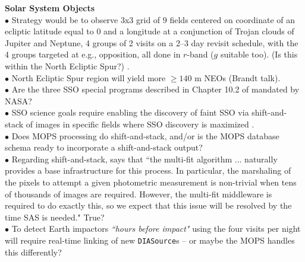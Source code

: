 \documentclass[DM,lsstdraft,toc]{lsstdoc}
\begin{document}
\medskip
\noindent \textbf{Solar System Objects}\\
$\bullet$ Strategy would be to observe 3x3 grid of 9 fields centered on coordinate of an ecliptic latitude equal to 0 and a longitude at a conjunction of Trojan clouds of Jupiter and Neptune, 4 groups of 2 visits on a 2--3 day revisit schedule, with the 4 groups targeted at e.g., opposition, all done in $r$-band ($g$ suitable too). (Is this within the North Ecliptic Spur?) \citep{BeckerWP}. \\
$\bullet$ North Ecliptic Spur region will yield more $\geq140$ m NEOs (Brandt talk).  \\
$\bullet$ Are the three SSO special programs described in Chapter 10.2 of \cite{OSWP} mandated by NASA? \\
$\bullet$ SSO science goals require enabling the discovery of faint SSO via shift-and-stack of images in specific fields where SSO discovery is maximized \citep{BeckerWP}. \\
$\bullet$ Does MOPS processing do shift-and-stack, and/or is the MOPS database schema ready to incorporate a shift-and-stack output? \\
$\bullet$ Regarding shift-and-stack, \cite{BeckerWP} says that ``the multi-fit algorithm ... naturally provides a base infrastructure for this process. In particular, the marshaling of the pixels to attempt a given photometric measurement is non-trivial when tens of thousands of images are required. However, the multi-fit middleware is required to do exactly this, so we expect that this issue will be resolved by the time SAS is needed." True? \\
$\bullet$ To detect Earth impactors {\it ``hours before impact"} using the four visits per night will require real-time linking of new {\tt DIASource}s -- or maybe the MOPS handles this differently? \\
\end{document}
